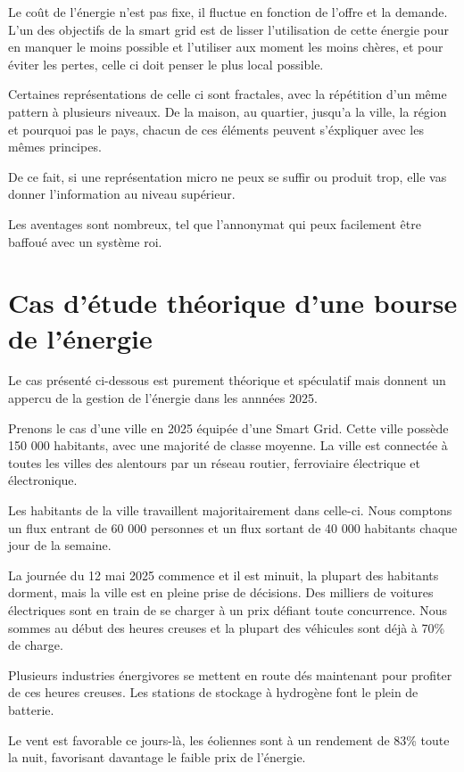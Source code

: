Le coût de l'énergie n'est pas fixe, il fluctue en fonction de l'offre et la demande.
L'un des objectifs de la smart grid est de lisser l'utilisation de cette énergie pour
en manquer le moins possible et l'utiliser aux moment les moins chères, et pour éviter les pertes,
celle ci doit penser le plus local possible.

Certaines représentations de celle ci sont fractales, avec la répétition d'un même pattern à
plusieurs niveaux.
De la maison, au quartier, jusqu'a la ville, la région et pourquoi pas le pays, chacun de
ces éléments peuvent s'éxpliquer avec les mêmes principes.

De ce fait, si une représentation micro ne peux se suffir ou produit trop, elle vas donner l'information
au niveau supérieur.

Les aventages sont nombreux, tel que l'annonymat qui peux facilement être baffoué avec un système roi.

\section{Cas d'étude théorique d'une bourse de l'énergie}

Le cas présenté ci-dessous est purement théorique et spéculatif mais donnent un appercu de
la gestion de l'énergie dans les annnées 2025.

Prenons le cas d'une ville en 2025 équipée d'une Smart Grid.
Cette ville possède 150 000 habitants, avec une majorité de classe moyenne.
La ville est connectée à toutes les villes des alentours par un réseau routier, ferroviaire
électrique et électronique.

Les habitants de la ville travaillent majoritairement dans celle-ci.
Nous comptons un flux entrant de 60 000 personnes et un flux sortant de 40 000 habitants chaque jour
de la semaine.

La journée du 12 mai 2025 commence et il est minuit, la plupart des habitants dorment, mais
la ville est en pleine prise de décisions.
Des milliers de voitures électriques sont en train de se charger à un prix défiant toute concurrence.
Nous sommes au début des heures creuses et la plupart des véhicules sont déjà à 70\% de charge.

Plusieurs industries énergivores se mettent en route dés maintenant pour profiter de ces heures creuses.
Les stations de stockage à hydrogène font le plein de batterie.

Le vent est favorable ce jours-là, les éoliennes sont à un rendement de 83\% toute la nuit,
favorisant davantage le faible prix de l'énergie.

